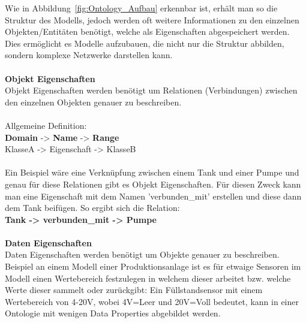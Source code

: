 Wie in Abbildung~\ref{fig:Ontology_Aufbau} erkennbar ist, erhält man so die Struktur des Modells, jedoch werden oft weitere Informationen zu den einzelnen Objekten/Entitäten benötigt, welche als Eigenschaften abgespeichert werden.\\
Dies ermöglicht es Modelle aufzubauen, die nicht nur die Struktur abbilden, sondern komplexe Netzwerke darstellen kann.\\
\\
\noindent \textbf{Objekt Eigenschaften}\\
Objekt Eigenschaften werden benötigt um Relationen (Verbindungen) zwischen den einzelnen Objekten genauer zu beschreiben.\\
\\
Allgemeine Definition:\\
\textbf{Domain} -> \textbf{Name} -> \textbf{Range}\\
KlasseA -> Eigenschaft -> KlasseB\\
\\
Ein Beispiel wäre eine Verknüpfung zwischen einem Tank und einer Pumpe und genau für diese Relationen gibt es Objekt Eigenschaften. Für diesen Zweck kann man eine Eigenschaft mit dem Namen 'verbunden\_mit' erstellen und diese dann dem Tank beifügen. So ergibt sich die Relation:\\
\textbf{Tank -> verbunden\_mit -> Pumpe}
\\
\\
\textbf{Daten Eigenschaften}\\
Daten Eigenschaften werden benötigt um Objekte genauer zu beschreiben. 
\\
Beispiel an einem Modell einer Produktionsanlage ist es für etwaige Sensoren im Modell einen Wertebereich festzulegen in welchem dieser arbeitet bzw. welche Werte dieser sammelt oder zurückgibt: Ein Füllstandsensor mit einem Wertebereich von 4-20V, wobei 4V=Leer und 20V=Voll bedeutet, kann in einer Ontologie mit wenigen Data Properties abgebildet werden.

